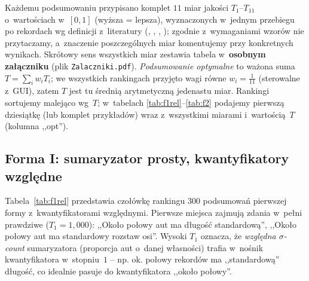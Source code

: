 \documentclass{article}
\begin{document}
Każdemu podsumowaniu przypisano komplet $11$ miar jakości
$T_1$--$T_{11}$ o~wartościach w~$[0,1]$ (wyższa = lepsza), wyznaczonych
w~jednym przebiegu po rekordach wg definicji z~literatury
(\cite{yager82}, \cite{kacprzyk-yager01}, \cite{zadrozny06},
\cite{niewiadomski08}); zgodnie z~wymaganiami wzorów nie przytaczamy,
a~znaczenie poszczególnych miar komentujemy przy konkretnych wynikach.
Skrótowy sens wszystkich miar zestawia tabela w~\textbf{osobnym
załączniku} (plik \texttt{Zalaczniki.pdf}). \emph{Podsumowanie
optymalne} to ważona suma $T = \sum_{i} w_i T_i$; we wszystkich rankingach
przyjęto wagi równe $w_i = \tfrac{1}{11}$ (sterowalne z~GUI), zatem $T$ jest
tu średnią arytmetyczną jedenastu miar. Rankingi sortujemy malejąco wg~$T$;
w~tabelach \ref{tab:f1rel}--\ref{tab:f2} podajemy pierwszą dziesiątkę
(lub komplet przykładów) wraz z~wszystkimi miarami i~wartością~$T$ (kolumna
,,opt'').

\subsection{Forma I: sumaryzator prosty, kwantyfikatory względne}
\label{sec:f1rel}

Tabela~\ref{tab:f1rel} przedstawia czołówkę rankingu $300$ podsumowań
pierwszej formy z~kwantyfikatorami względnymi. Pierwsze miejsca zajmują
zdania w~pełni prawdziwe ($T_1 = 1{,}000$): ,,Około połowy aut ma długość
standardową'', ,,Około połowy aut ma standardowy rozstaw osi''. Wysoki
$T_1$ oznacza, że \emph{względna $\sigma$-count} sumaryzatora (proporcja
aut o~danej własności) trafia w~nośnik kwantyfikatora w~stopniu~$1$ --
np. ok. połowy rekordów ma ,,standardową'' długość, co idealnie pasuje do
kwantyfikatora ,,około połowy''.
\end{document}
